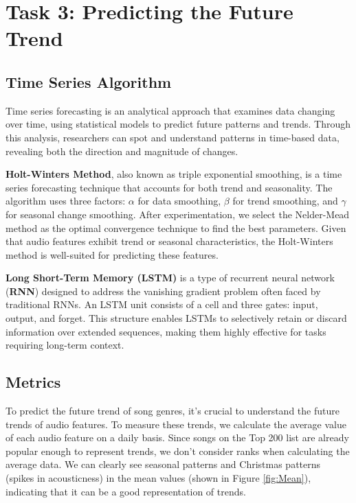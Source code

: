 \documentclass{article}
\begin{document}




\section{Task 3: Predicting the Future Trend}
\subsection{Time Series Algorithm}

Time series forecasting is an analytical approach that examines data changing over time, using statistical models to predict future patterns and trends.  Through this analysis, researchers can spot and understand patterns in time-based data, revealing both the direction and magnitude of changes.


\textbf{Holt-Winters Method}, also known as triple exponential smoothing, is a time series forecasting technique that accounts for both trend and seasonality\cite{winters}. The algorithm uses three factors: $\alpha$ for data smoothing, $\beta$ for trend smoothing, and $\gamma$ for seasonal change smoothing. After experimentation, we select the Nelder-Mead method as the optimal convergence technique to find the best parameters. Given that audio features exhibit trend or seasonal characteristics, the Holt-Winters method is well-suited for predicting these features. 


\textbf{Long Short-Term Memory (LSTM)} is a type of recurrent neural network (\textbf{RNN}) designed to address the vanishing gradient\cite{vanish_gradient} problem often faced by traditional RNNs. An LSTM unit consists of a cell and three gates: input, output, and forget. This structure enables LSTMs to selectively retain or discard information over extended sequences, making them highly effective for tasks requiring long-term context. 

\subsection{Metrics}
To predict the future trend of song genres, it's crucial to understand the future trends of audio features. To measure these trends, we calculate the average value of each audio feature on a daily basis. Since songs on the Top 200 list are already popular enough to represent trends, we don't consider ranks when calculating the average data. We can clearly see seasonal patterns and Christmas patterns (spikes in acousticness) in the mean values (shown in Figure \ref {fig:Mean}), indicating that it can be a good representation of trends. 
\end{document}

